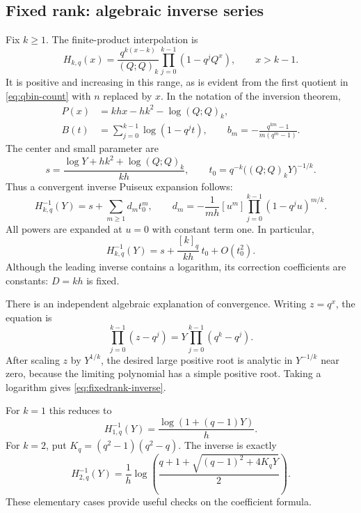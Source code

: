 \documentclass[11pt]{article}
\numberwithin{equation}{section}
\theoremstyle{definition}
\newcommand{\coef}[2]{[#1^{#2}]}
\newcommand{\pp}[1]{(Q;Q)_{#1}}
\begin{document}
\subsection{Fixed rank: algebraic inverse series}
\label{sec:fixedrank}

Fix $k\ge1$. The finite-product interpolation is
\begin{equation}\label{eq:fixedrank-interp}
 H_{k,q}(x)=\frac{q^{k(x-k)}}{\pp{k}}
              \prod_{j=0}^{k-1}(1-q^jQ^x),\qquad x>k-1.
\end{equation}
It is positive and increasing in this range, as is evident from the first quotient in \eqref{eq:qbin-count} with $n$ replaced by $x$. In the notation of the inversion theorem,
\begin{align}
 P(x)&=khx-hk^2-\log\pp{k},\label{eq:fixedrank-phase}\\
 B(t)&=\sum_{j=0}^{k-1}\log(1-q^jt),\qquad
 b_m=-\frac{q^{km}-1}{m(q^m-1)}.\label{eq:fixedrank-tail}
\end{align}
The center and small parameter are
\begin{equation}\label{eq:fixedrank-center}
 s=\frac{\log Y+hk^2+\log\pp{k}}{kh},
 \qquad t_0=q^{-k}\bigl(\pp{k}Y\bigr)^{-1/k}.
\end{equation}
Thus a convergent inverse Puiseux expansion follows:
\begin{equation}\label{eq:fixedrank-inverse}
 H_{k,q}^{-1}(Y)
 =s+\sum_{m\ge1}d_m t_0^m,
 \qquad
 d_m=-\frac1{mh}\coef{u}{m}
       \prod_{j=0}^{k-1}(1-q^ju)^{m/k}.
\end{equation}
All powers are expanded at $u=0$ with constant term one. In particular,
\begin{equation}\label{eq:fixedrank-first}
 H_{k,q}^{-1}(Y)=s+\frac{[k]_q}{kh}\,t_0+O(t_0^2).
\end{equation}
Although the leading inverse contains a logarithm, its correction coefficients are constants: $D=kh$ is fixed.

There is an independent algebraic explanation of convergence. Writing $z=q^x$, the equation is
\begin{equation}\label{eq:fixedrank-algebraic}
 \prod_{j=0}^{k-1}(z-q^j)=Y\prod_{j=0}^{k-1}(q^k-q^j).
\end{equation}
After scaling $z$ by $Y^{1/k}$, the desired large positive root is analytic in $Y^{-1/k}$ near zero, because the limiting polynomial has a simple positive root. Taking a logarithm gives \eqref{eq:fixedrank-inverse}.

For $k=1$ this reduces to
\[
 H_{1,q}^{-1}(Y)=\frac{\log(1+(q-1)Y)}h.
\]
For $k=2$, put $K_q=(q^2-1)(q^2-q)$. The inverse is exactly
\begin{equation}\label{eq:k2-inverse}
 H_{2,q}^{-1}(Y)=\frac1h\log\left(
 \frac{q+1+\sqrt{(q-1)^2+4K_qY}}2\right).
\end{equation}
These elementary cases provide useful checks on the coefficient formula.
\end{document}
